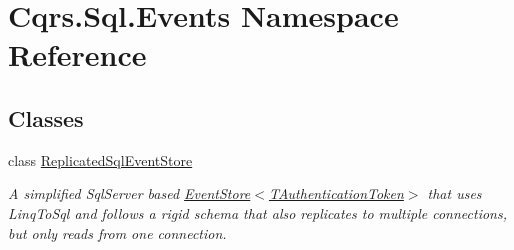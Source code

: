 \hypertarget{namespaceCqrs_1_1Sql_1_1Events}{}\section{Cqrs.\+Sql.\+Events Namespace Reference}
\label{namespaceCqrs_1_1Sql_1_1Events}
\subsection*{Classes}
\begin{DoxyCompactItemize}
\item 
class \hyperlink{classCqrs_1_1Sql_1_1Events_1_1ReplicatedSqlEventStore}{Replicated\+Sql\+Event\+Store}
\begin{DoxyCompactList}\small\item\em A simplified Sql\+Server based \hyperlink{classCqrs_1_1Events_1_1EventStore_a6346cb2aea4c5b4e740dc6cfb15abab8}{Event\+Store$<$\+T\+Authentication\+Token$>$} that uses Linq\+To\+Sql and follows a rigid schema that also replicates to multiple connections, but only reads from one connection. \end{DoxyCompactList}\end{DoxyCompactItemize}
